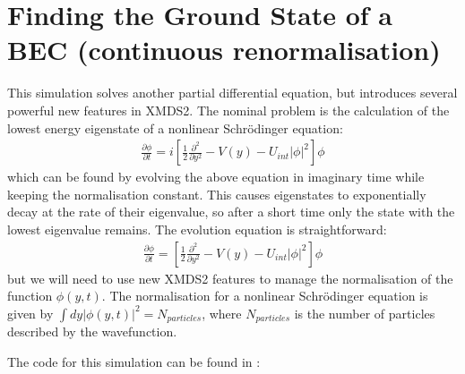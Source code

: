 \documentclass[letterpaper,10pt,english]{sphinxmanual}
\begin{document}
\section{Finding the Ground State of a BEC (continuous renormalisation)}
\label{\detokenize{worked_examples:finding-the-ground-state-of-a-bec-continuous-renormalisation}}\label{\detokenize{worked_examples:groundstatebec}}
\sphinxAtStartPar
This simulation solves another partial differential equation, but introduces several powerful new features in XMDS2.  The nominal problem is the calculation of the lowest energy eigenstate of a non\sphinxhyphen{}linear Schrödinger equation:
\begin{equation*}
\begin{split}\frac{\partial \phi}{\partial t} = i \left[\frac{1}{2}\frac{\partial^2}{\partial y^2} - V(y) - U_{int}|\phi|^2\right]\phi\end{split}
\end{equation*}
\sphinxAtStartPar
which can be found by evolving the above equation in imaginary time while keeping the normalisation constant.  This causes eigenstates to exponentially decay at the rate of their eigenvalue, so after a short time only the state with the lowest eigenvalue remains.  The evolution equation is straightforward:
\begin{equation*}
\begin{split}\frac{\partial \phi}{\partial t} = \left[\frac{1}{2}\frac{\partial^2}{\partial y^2} - V(y) - U_{int}|\phi|^2\right]\phi\end{split}
\end{equation*}
\sphinxAtStartPar
but we will need to use new XMDS2 features to manage the normalisation of the function \(\phi(y,t)\).  The normalisation for a non\sphinxhyphen{}linear Schrödinger equation is given by \(\int dy |\phi(y,t)|^2 = N_{particles}\), where \(N_{particles}\) is the number of particles described by the wavefunction.

\sphinxAtStartPar
The code for this simulation can be found in :
\end{document}
